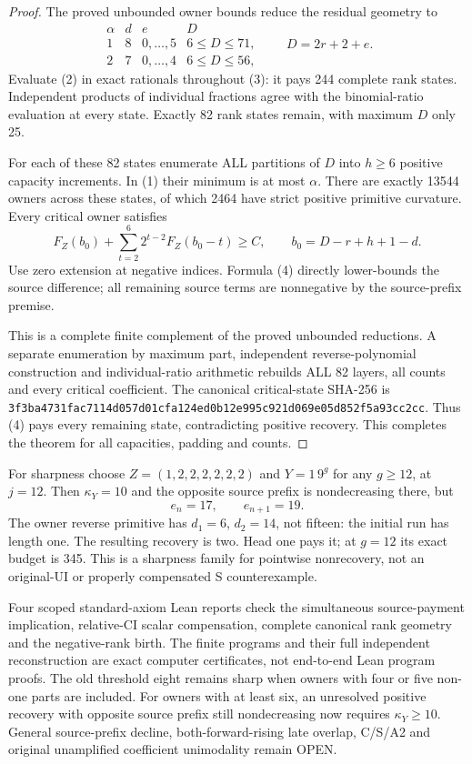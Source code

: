 \begin{proof}
The proved unbounded owner bounds reduce the residual geometry to
\[
 \begin{array}{c|c|c|c}
 \alpha&d&e&D\\\hline
 1&8&0,\ldots,5&6\le D\le71,\\
 2&7&0,\ldots,4&6\le D\le56,
 \end{array}\qquad D=2r+2+e.                         \tag{3}
\]
Evaluate (2) in exact rationals throughout (3): it pays 244
complete rank states. Independent products of individual fractions
agree with the binomial-ratio evaluation at every state.
Exactly 82 rank states remain, with maximum $D$ only 25.

For each of these 82 states enumerate ALL partitions of $D$ into
$h\ge6$ positive capacity increments. In (1) their minimum is
at most $\alpha$. There are exactly 13544 owners across these
states, of which 2464 have strict positive primitive curvature.
Every critical owner satisfies
\[
 F_Z(b_0)+\sum_{t=2}^{6}2^{t-2}F_Z(b_0-t)\ge C,
               \qquad b_0=D-r+h+1-d.                 \tag{4}
\]
Use zero extension at negative indices. Formula (4) directly
lower-bounds the source difference; all remaining source terms
are nonnegative by the source-prefix premise.

This is a complete finite complement of the proved unbounded
reductions. A separate enumeration by maximum part, independent
reverse-polynomial construction and individual-ratio arithmetic
rebuilds ALL 82 layers, all counts and every critical coefficient.
The canonical critical-state SHA-256 is
\texttt{3f3ba4731fac7114d057d01cfa124ed0b12e995c921d069e05d852f5a93cc2cc}.
Thus (4) pays every remaining state, contradicting positive recovery.
This completes the theorem for all capacities, padding and counts.
\end{proof}

For sharpness choose $Z=(1,2,2,2,2,2,2)$ and $Y=1\,9^g$ for
any $g\ge12$, at $j=12$. Then $\kappa_Y=10$ and the opposite
source prefix is nondecreasing there, but
\[
                         e_n=17,\qquad e_{n+1}=19.
\]
The owner reverse primitive has $d_1=6$, $d_2=14$, not fifteen:
the initial run has length one. The resulting recovery is two.
Head one pays it; at $g=12$ its exact budget is 345.
This is a sharpness family for pointwise nonrecovery, not an
original-UI or properly compensated S counterexample.

Four scoped standard-axiom Lean reports check the simultaneous
source-payment implication, relative-CI scalar compensation,
complete canonical rank geometry and the negative-rank birth.
The finite programs and their full independent reconstruction
are exact computer certificates, not end-to-end Lean program proofs.
The old threshold eight remains sharp when owners with four or
five non-one parts are included. For owners with at least six,
an unresolved positive recovery with opposite source prefix still
nondecreasing now requires $\kappa_Y\ge10$.
General source-prefix decline, both-forward-rising late overlap,
C/S/A2 and original unamplified coefficient unimodality remain OPEN.
